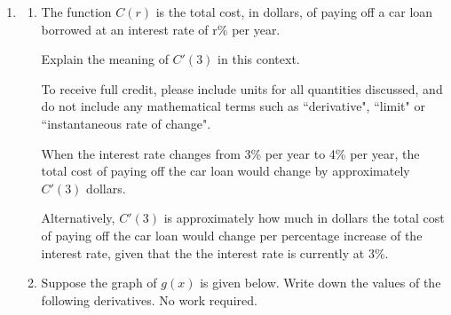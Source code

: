 \documentclass[11pt]{article}
\begin{document}
\begin{enumerate}


\item 

\begin{enumerate}
    \item The function $C(r)$ is the total cost, in dollars, of paying off a car loan borrowed at an interest rate of r\% per year.
    
    Explain the meaning of $C'(3)$ in this context. 

    To receive full credit, please include units for all quantities discussed, and do not include any mathematical terms such as ``derivative", ``limit" or ``instantaneous rate of change".

    {\color{blue} When the interest rate changes from 3\% per year to 4\% per year, the total cost of paying off the car loan would change by approximately $C'(3)$ dollars.
    
    Alternatively, $C'(3)$ is approximately how much in dollars the total cost of paying off the car loan would change per percentage increase of the interest rate, given that the the interest rate is currently at 3\%.}

    \vfill


    \item Suppose the graph of $g(x)$ is given below. Write down the values of the following derivatives. No work required.

    \begin{center}
\end{center}
\end{enumerate}
\end{enumerate}
\end{document}
